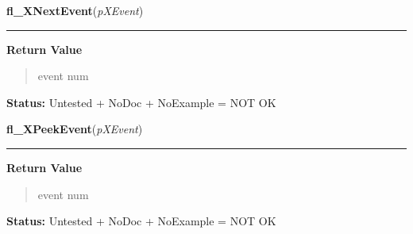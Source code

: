     \label{xformslib:library:fl_XNextEvent}

    \vspace{0.5ex}

\hspace{.8\funcindent}\begin{boxedminipage}{\funcwidth}

    \raggedright \textbf{fl\_XNextEvent}(\textit{pXEvent})

    \vspace{-1.5ex}

    \rule{\textwidth}{0.5\fboxrule}
\setlength{\parskip}{2ex}
\setlength{\parskip}{1ex}
      \textbf{Return Value}
    \vspace{-1ex}

      \begin{quote}
      event num

      \end{quote}

\textbf{Status:} Untested + NoDoc + NoExample = NOT OK



    \end{boxedminipage}

    \label{xformslib:library:fl_XPeekEvent}

    \vspace{0.5ex}

\hspace{.8\funcindent}\begin{boxedminipage}{\funcwidth}

    \raggedright \textbf{fl\_XPeekEvent}(\textit{pXEvent})

    \vspace{-1.5ex}

    \rule{\textwidth}{0.5\fboxrule}
\setlength{\parskip}{2ex}
\setlength{\parskip}{1ex}
      \textbf{Return Value}
    \vspace{-1ex}

      \begin{quote}
      event num

      \end{quote}

\textbf{Status:} Untested + NoDoc + NoExample = NOT OK



    \end{boxedminipage}


